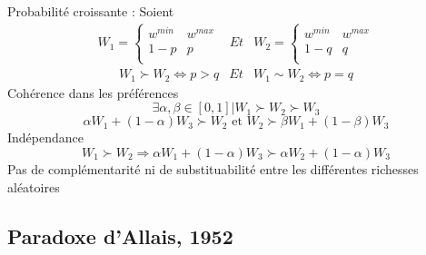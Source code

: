 \documentclass[a4paper, 12pt]{report}
\begin{document}
Probabilité croissante :
Soient 
$$
\begin{matrix}
W_1= \left\{\begin{matrix}
	w^{min} & w^{max} \\
	1-p & p \\
\end{matrix}\right. & Et & 
W_2= \left\{\begin{matrix}
	w^{min} & w^{max} \\
	1-q & q\\
\end{matrix}\right.
\end{matrix}
$$
$$
\begin{matrix}
W_1 \succ W_2 \Leftrightarrow p > q & Et &  W_1 \sim W_2 \Leftrightarrow p=q
\end{matrix}
$$
Cohérence dans les préférences
$$
\exists \alpha,\beta \in[0,1] |W_1 \succ W_2 \succ W_3 
$$
$$
\alpha W_1 + (1-\alpha)W_3 \succ W_2 \text{ et } W_2 \succ \beta W_1 + (1-\beta)W_3
$$
Indépendance 
$$
W_1 \succ W_2 \Rightarrow \alpha W_1 + (1-\alpha)W_3 \succ \alpha W_2 +(1-\alpha)W_3
$$
Pas de complémentarité ni de substituabilité entre les différentes richesses aléatoires

\subsection{Paradoxe d'Allais, 1952}
\end{document}
